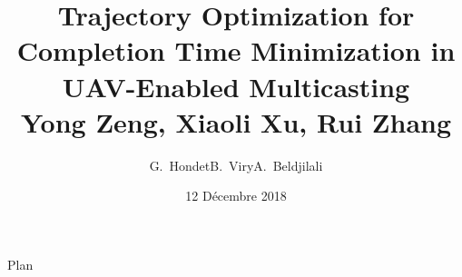 \documentclass[utf8,aspectratio=43]{beamer}
\title[
Optimisation de trajectoire et du temps de mission d'un drone de
télécommunication multicast.
]{
  Trajectory Optimization for Completion Time Minimization in
  UAV-Enabled Multicasting\\
  Yong Zeng, Xiaoli Xu, Rui Zhang
}
\author[Hondet, Viry, Beldjilali]{
  G.~Hondet\quad B.~Viry\quad A.~Beldjilali}
\date{12 Décembre 2018}
\institute{ENAC}
\begin{document}
\maketitle

\begin{frame}{Plan}
\tableofcontents
\end{frame}






\end{document}
